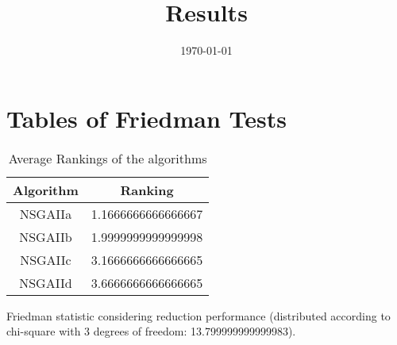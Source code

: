 \documentclass{article}
\title{Results}
\author{}
\date{\today}
\begin{document}
\oddsidemargin 0in \topmargin 0in\maketitle
\section{Tables of Friedman Tests}
\begin{table}[!htp]
\centering
\caption{Average Rankings of the algorithms
}\begin{tabular}{c|c}
Algorithm&Ranking\\
\hline
NSGAIIa&1.1666666666666667\\
NSGAIIb&1.9999999999999998\\
NSGAIIc&3.1666666666666665\\
NSGAIId&3.6666666666666665\\
\end{tabular}
\end{table}


Friedman statistic considering reduction performance (distributed according to chi-square with 3 degrees of freedom: 13.799999999999983).
\end{document}
